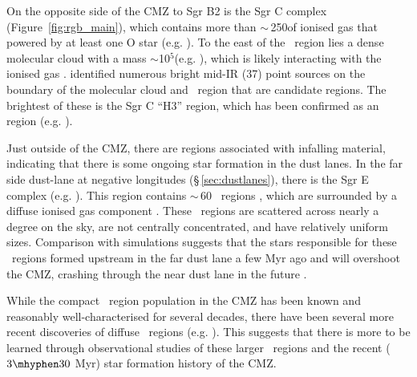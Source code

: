 On the opposite side of the CMZ to Sgr B2 is the Sgr C complex (Figure~\ref{fig:rgb_main}), which contains more than $\sim$\,250\msun of ionised gas that powered by at least one O star (e.g. \citealp{Liszt1995}). To the east of the \hii\ region lies a dense molecular cloud with a mass $\sim$10$^5$\msun (e.g. \citealp{Lis1994b}), which is likely interacting with the ionised gas \citep{Lang2010}. \citet{Hankins2020} identified numerous bright mid-IR (37\micron) point sources on the boundary of the molecular cloud and \hii\ region that are candidate \uchii regions. The brightest of these is the Sgr C ``H3'' region, which has been confirmed as an \uchii region (e.g. \citealp{Forster2000, Kendrew2013, Lu2019a, Lu2019b}).

Just outside of the CMZ, there are \hii regions associated with infalling material, indicating that there is some ongoing star formation in the dust lanes.
In the far side dust-lane at negative longitudes (\S\,\ref{sec:dustlanes}), there is the Sgr E complex (e.g. \citealp{Liszt1992}). This region contains $\sim$\,60 \hii\ regions \citep{Anderson2020}, which are surrounded by a diffuse ionised gas component \citep{Langer2015}. These \hii\ regions are scattered across nearly a degree on the sky, are not centrally concentrated, and have relatively uniform sizes. Comparison with simulations suggests that the stars responsible for these \hii\ regions formed upstream in the far dust lane a few Myr ago and will overshoot the CMZ, crashing through the near dust lane in the future \citep{Anderson2020}.

While the compact \hii\ region population in the CMZ has been known and reasonably well-characterised for several decades, there have been several more recent discoveries of diffuse \hii\ regions (e.g. \citealp{Henshaw2022, Heywood2022}). This suggests that there is more to be learned through observational studies of these larger \hii\ regions and the recent ($3\mhyphen30$ Myr) star formation history of the CMZ.